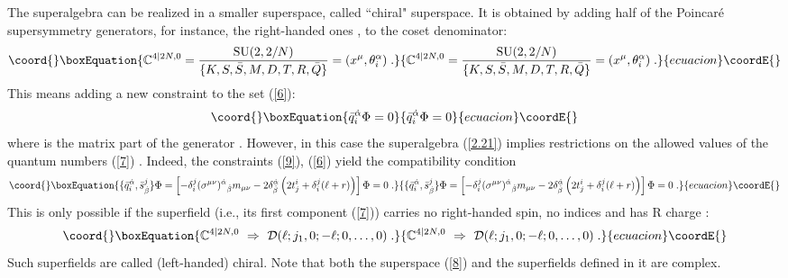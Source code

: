 \documentclass[a4paper,12pt]{article}
\begin{document}
The superalgebra \coordHE{} can be realized in a smaller 
superspace, called ``chiral" superspace. It is obtained by adding 
half of the Poincar\'{e} supersymmetry generators, for instance, the 
right-handed ones \coordHE{}, to the coset 
denominator: 
\begin{equation}\coord{}\boxEquation{
{\mathbb C}^{4\vert 2N,0} = {\mbox{SU}(2,2/N)\over \{K,S,\bar 
S,M,D,T,R,\bar Q\}} = (x^\mu,\theta^{\alpha}_i)\;. \label{8} 
}{
{\mathbb C}^{4\vert 2N,0} = {\mbox{SU}(2,2/N)\over \{K,S,\bar 
S,M,D,T,R,\bar Q\}} = (x^\mu,\theta^{\alpha}_i)\;. }{ecuacion}\coordE{}\end{equation} 
This means adding a new constraint to the set (\ref{6}):
\begin{equation}\coord{}\boxEquation{\label{9}
  \bar q^{\dot\alpha}_i\Phi=0
}{\bar q^{\dot\alpha}_i\Phi=0
}{ecuacion}\coordE{}\end{equation}
where \coordHE{} is the matrix part of the generator \coordHE{}. 
However, in this case the superalgebra (\ref{2.21}) implies 
restrictions on the allowed values of the quantum numbers 
(\ref{7}) \cite{wz}. Indeed, the constraints (\ref{9}), (\ref{6}) 
yield the compatibility condition 
\begin{equation}\coord{}\boxEquation{\label{10}
\{\bar q^{\dot\alpha}_i, \bar s^j_{\dot\beta} \}\Phi = \left[ 
-\delta^j_i (\sigma^{\mu\nu})^{\dot\alpha}{}_{\dot\beta}m_{\mu\nu} 
-2\delta^{\dot\alpha}_{\dot\beta}\left(2t^i_j +\delta^j_i(\ell+r) 
\right)\right] \Phi = 0\;. 
}{\{\bar q^{\dot\alpha}_i, \bar s^j_{\dot\beta} \}\Phi = \left[ 
-\delta^j_i (\sigma^{\mu\nu})^{\dot\alpha}{}_{\dot\beta}m_{\mu\nu} 
-2\delta^{\dot\alpha}_{\dot\beta}\left(2t^i_j +\delta^j_i(\ell+r) 
\right)\right] \Phi = 0\;. 
}{ecuacion}\coordE{}\end{equation}
This is only possible if the superfield (i.e., its first component 
(\ref{7})) carries no right-handed spin, no \coordHE{} indices 
and has R charge \coordHE{}: 
\begin{equation}\coord{}\boxEquation{\label{11}
  {\mathbb C}^{4\vert 2N,0} \ \Rightarrow \ 
{\cal D}(\ell;j_1,0;-\ell;0,\ldots,0)\;. 
}{{\mathbb C}^{4\vert 2N,0} \ \Rightarrow \ 
{\cal D}(\ell;j_1,0;-\ell;0,\ldots,0)\;. 
}{ecuacion}\coordE{}\end{equation}
Such superfields are called (left-handed) chiral. Note that both 
the superspace (\ref{8}) and the superfields defined in it are 
complex. 
 
\end{document}
